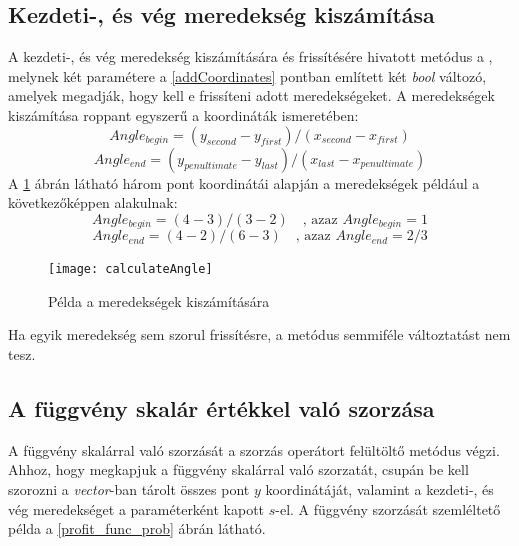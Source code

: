 \subsection{Kezdeti-, és vég meredekség kiszámítása} \label{calculateAngle}
A  kezdeti-, és vég meredekség kiszámítására és frissítésére hivatott metódus a , melynek két paramétere a \ref{addCoordinates} pontban említett két \textit{bool} változó, amelyek megadják, hogy kell e frissíteni adott meredekségeket.
A meredekségek kiszámítása roppant egyszerű a koordináták ismeretében:
$$Angle_{begin}=(y_{second}-y_{first}) / (x_{second}-x_{first})$$
$$Angle_{end}=(y_{penultimate}-y_{last}) / (x_{last}-x_{penultimate})$$
A \ref{calculate angle} ábrán látható három pont koordinátái alapján a meredekségek például a következőképpen alakulnak: 
$$Angle_{begin}=(4-3) / (3-2)\quad \text{, azaz } Angle_{begin}=1$$
$$Angle_{end}=(4-2) / (6-3)\quad \text{, azaz } Angle_{end}=2/3$$
\begin{figure}[H]
\begin{center}
\texttt{[image: calculateAngle]}
\caption{Példa a meredekségek kiszámítására}
\label{calculate angle}
\end{center}
\end{figure}
Ha egyik meredekség sem szorul frissítésre, a metódus semmiféle változtatást nem tesz.
\subsection{A függvény skalár értékkel való szorzása} \label{multiplyByScalar}
A függvény skalárral való szorzását a szorzás operátort felültöltő metódus végzi.
Ahhoz, hogy megkapjuk a függvény skalárral való szorzatát, csupán be kell szorozni a \textit{vector}-ban tárolt összes pont $y$ koordinátáját, valamint a kezdeti-, és vég meredekséget a paraméterként kapott $s$-el.
A függvény szorzását szemléltető példa a \ref{profit_func_prob} ábrán látható.
